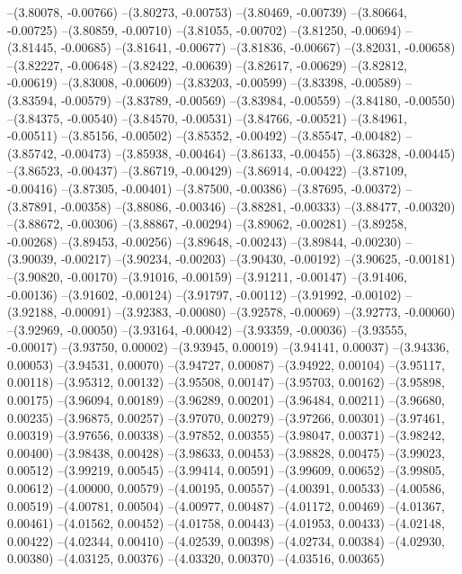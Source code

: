 --(3.80078, -0.00766)
--(3.80273, -0.00753)
--(3.80469, -0.00739)
--(3.80664, -0.00725)
--(3.80859, -0.00710)
--(3.81055, -0.00702)
--(3.81250, -0.00694)
--(3.81445, -0.00685)
--(3.81641, -0.00677)
--(3.81836, -0.00667)
--(3.82031, -0.00658)
--(3.82227, -0.00648)
--(3.82422, -0.00639)
--(3.82617, -0.00629)
--(3.82812, -0.00619)
--(3.83008, -0.00609)
--(3.83203, -0.00599)
--(3.83398, -0.00589)
--(3.83594, -0.00579)
--(3.83789, -0.00569)
--(3.83984, -0.00559)
--(3.84180, -0.00550)
--(3.84375, -0.00540)
--(3.84570, -0.00531)
--(3.84766, -0.00521)
--(3.84961, -0.00511)
--(3.85156, -0.00502)
--(3.85352, -0.00492)
--(3.85547, -0.00482)
--(3.85742, -0.00473)
--(3.85938, -0.00464)
--(3.86133, -0.00455)
--(3.86328, -0.00445)
--(3.86523, -0.00437)
--(3.86719, -0.00429)
--(3.86914, -0.00422)
--(3.87109, -0.00416)
--(3.87305, -0.00401)
--(3.87500, -0.00386)
--(3.87695, -0.00372)
--(3.87891, -0.00358)
--(3.88086, -0.00346)
--(3.88281, -0.00333)
--(3.88477, -0.00320)
--(3.88672, -0.00306)
--(3.88867, -0.00294)
--(3.89062, -0.00281)
--(3.89258, -0.00268)
--(3.89453, -0.00256)
--(3.89648, -0.00243)
--(3.89844, -0.00230)
--(3.90039, -0.00217)
--(3.90234, -0.00203)
--(3.90430, -0.00192)
--(3.90625, -0.00181)
--(3.90820, -0.00170)
--(3.91016, -0.00159)
--(3.91211, -0.00147)
--(3.91406, -0.00136)
--(3.91602, -0.00124)
--(3.91797, -0.00112)
--(3.91992, -0.00102)
--(3.92188, -0.00091)
--(3.92383, -0.00080)
--(3.92578, -0.00069)
--(3.92773, -0.00060)
--(3.92969, -0.00050)
--(3.93164, -0.00042)
--(3.93359, -0.00036)
--(3.93555, -0.00017)
--(3.93750, 0.00002)
--(3.93945, 0.00019)
--(3.94141, 0.00037)
--(3.94336, 0.00053)
--(3.94531, 0.00070)
--(3.94727, 0.00087)
--(3.94922, 0.00104)
--(3.95117, 0.00118)
--(3.95312, 0.00132)
--(3.95508, 0.00147)
--(3.95703, 0.00162)
--(3.95898, 0.00175)
--(3.96094, 0.00189)
--(3.96289, 0.00201)
--(3.96484, 0.00211)
--(3.96680, 0.00235)
--(3.96875, 0.00257)
--(3.97070, 0.00279)
--(3.97266, 0.00301)
--(3.97461, 0.00319)
--(3.97656, 0.00338)
--(3.97852, 0.00355)
--(3.98047, 0.00371)
--(3.98242, 0.00400)
--(3.98438, 0.00428)
--(3.98633, 0.00453)
--(3.98828, 0.00475)
--(3.99023, 0.00512)
--(3.99219, 0.00545)
--(3.99414, 0.00591)
--(3.99609, 0.00652)
--(3.99805, 0.00612)
--(4.00000, 0.00579)
--(4.00195, 0.00557)
--(4.00391, 0.00533)
--(4.00586, 0.00519)
--(4.00781, 0.00504)
--(4.00977, 0.00487)
--(4.01172, 0.00469)
--(4.01367, 0.00461)
--(4.01562, 0.00452)
--(4.01758, 0.00443)
--(4.01953, 0.00433)
--(4.02148, 0.00422)
--(4.02344, 0.00410)
--(4.02539, 0.00398)
--(4.02734, 0.00384)
--(4.02930, 0.00380)
--(4.03125, 0.00376)
--(4.03320, 0.00370)
--(4.03516, 0.00365)
